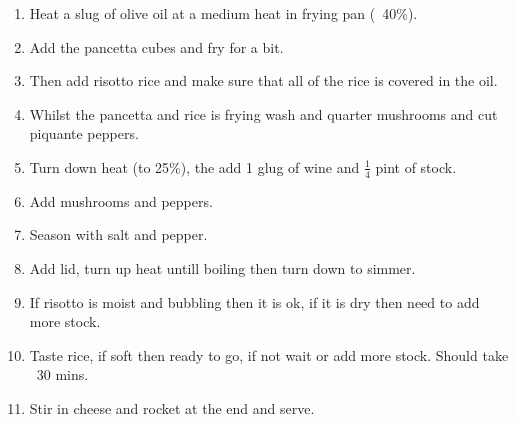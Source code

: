 \documentclass[a4paper,10pt, onecolumn]{article}
\begin{document}
\begin{enumerate}
\item Heat a slug of olive oil at a medium heat in frying pan (~40\%).
\item Add the pancetta cubes and fry for a bit.
\item Then add risotto rice and make sure that all of the rice is covered in the oil.
\item Whilst the pancetta and rice is frying wash and quarter mushrooms and cut piquante peppers.
\item Turn down heat (to 25\%), the add 1 glug of wine and $\frac{1}{4}$ pint of stock.
\item Add mushrooms and peppers.
\item Season with salt and pepper.
\item Add lid, turn up heat untill boiling then turn down to simmer.
\item If risotto is moist and bubbling then it is ok, if it is dry then need to add more stock.
\item Taste rice, if soft then ready to go, if not wait or add more stock. Should take ~30 mins.
\item Stir in cheese and rocket at the end and serve.
\end{enumerate}
 
\end{document}
